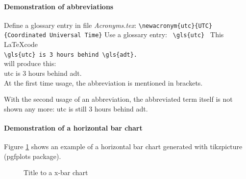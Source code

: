 \paragraph{Demonstration of abbreviations}
Define a glossary entry in file \textit{Acronyms.tex}:
\newline
\verb!\newacronym{utc}{UTC}{Coordinated Universal Time}!
\newline
Use a glossary entry: \verb! \gls{utc} !
\newline
This \LaTeX code \\

\verb*|\gls{utc} is 3 hours behind \gls{adt}.| \\

will produce this: \\

\gls{utc} is 3 hours behind \gls{adt}.\\

At the first time usage, the abbreviation is mentioned in brackets.

With the second usage of an abbreviation, the abbreviated term itself is not shown any more:
\gls{utc} is still 3 hours behind \gls{adt}.\\

\paragraph{Demonstration of a horizontal bar chart}
Figure \ref{fig:XBarChart} shows an example of a horizontal bar chart generated with tikzpicture (pgfplots package).

\begin{figure}
	\centering
	\caption{\label{fig:XBarChart}Title to a x-bar chart}
\end{figure}

